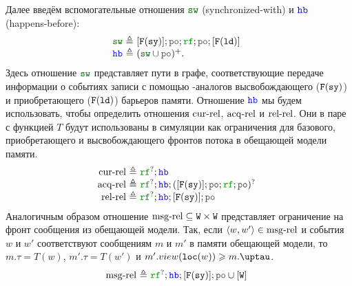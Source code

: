   Далее введём вспомогательные отношения $\lSW$ (synchronized-with) и $\lHB$ (happens-before):
  \[\begin{array}{@{}r@{~}r@{~}l}
  \lSW & \defeq & [\lDMBSY]; \lPO; \lRF; \lPO; [\lDMBLD] \\
  \lHB & \defeq & (\lSW \cup \lPO)^{+}. \\
  \end{array}\]
  Здесь отношение $\lSW$ представляет пути в графе, соответствующие передаче информации о событиях
  записи с помощью \ARM-аналогов высвобождающего (${{\mathtt{F}}}(\mathtt{sy})$) и приобретающего (${{\mathtt{F}}}(\mathtt{ld})$) барьеров
  памяти. Отношение $\lHB$ мы будем использовать, чтобы определить
  отношения ${\rm cur\text{-}rel}$, ${\rm acq\text{-}rel}$ и ${\rm rel\text{-}rel}$. Они в паре с функцией $T$ будут использованы в симуляции
  как ограничения для базового, приобретающего и высвобождающего фронтов потока в обещающей модели памяти.
  \[\begin{array}{@{}r@{~}r@{~}l}
  \curRel & \defeq & \lRF^{?}; \lHB \\
  \acqRel & \defeq & \lRF^{?}; \lHB; ([\lDMBSY]; \lPO; \lRF; \lPO)^? \\
  \relRel & \defeq & \lRF^{?}; \lHB; [\lDMBSY]; \lPO \\
  \end{array}\]
  Аналогичным образом отношение ${\rm msg\text{-}rel} \subseteq {\mathtt{W}} \times {\mathtt{W}}$ представляет ограничение на фронт сообщения
  из обещающей модели. Так, если ${\langle{w, w'}\rangle} \in {\rm msg\text{-}rel}$ и события $w$ и $w'$ соответствуют
  сообщениям $m$ и $m'$ в памяти обещающей модели, то $m.\tau = T(w)$, $m'.\tau = T(w')$ и
  $m'.\view(\lLOC(w)) \ge m.\tau$.
  \[\begin{array}{@{}r@{~}r@{~}l}
  \msgRel & \defeq & \lRF^{?}; \lHB; [\lDMBSY]; \lPO \cup [\lW] \\
  \end{array}\]
  
